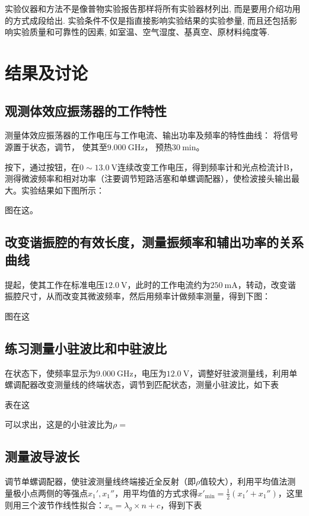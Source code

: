\documentclass[font=fandol]{mpltx}
\begin{document}
实验仪器和方法不是像普物实验报告那样将所有实验器材列出, 而是要用介绍功用的方式成段给出.
实验条件不仅是指直接影响实验结果的实验参量, 而且还包括影响实验质量和可靠性的因素, 如室温、空气湿度、基真空、原材料纯度等.

\section{结果及讨论}
\subsection{观测体效应振荡器的工作特性}
测量体效应振荡器的工作电压与工作电流、输出功率及频率的特性曲线：
将信号源置于状态，调节，
使其至$\qty{9.000}{\GHz}$，
预热$\qty{30}{\minute}$。
\par
按下，通过按钮，在$0\sim\qty{13.0}{\V}$连续改变工作电压，得到频率计和光点检流计B，测得微波频率和相对功率（注要调节短路活塞和单螺调配器），使检波接头输出最大。实验结果如下图所示：

图在这。

\subsection{改变谐振腔的有效长度，测量振频率和辅出功率的关系曲线}
提起，使其工作在标准电压$\qty{12.0}{\V}$，此时的工作电流约为$\qty{250}{\mA}$，转动，改变谐振腔尺寸，从而改变其微波频率，然后用频率计做频率测量，得到下图：

图在这

\subsection{练习测量小驻波比和中驻波比}
在状态下，使频率显示为$\qty{9.000}{\GHz}$，电压为$\qty{12.0}{\V}$，调整好驻波测量线，利用单螺调配器改变测量线的终端状态，调节到匹配状态，测量小驻波比，如下表

表在这

可以求出，这是的小驻波比为$\rho=$

\subsection{测量波导波长}
调节单螺调配器，使驻波测量线终端接近全反射（即$\rho$值较大），利用平均值法测量极小点两侧的等强点$x_1',x_1''$，用平均值的方式求得$x'_{\min}=\frac{1}{2}(x_1'+x_1'')$，这里则用三个波节作线性拟合：$x_n=\lambda_g\times n + c$，得到下表
\end{document}
